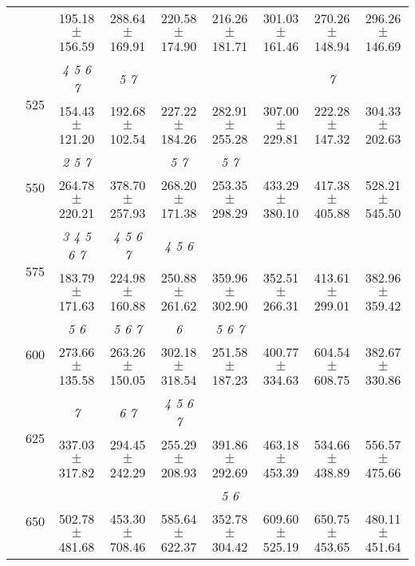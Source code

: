 \begin{table}[h]
{\begin{tabular}{
        ccccccccc}
 & & 195.18 $\pm$ 156.59& 288.64 $\pm$ 169.91& 220.58 $\pm$ 174.90& 216.26 $\pm$ 181.71& 301.03 $\pm$ 161.46& 270.26 $\pm$ 148.94& 296.26 $\pm$ 146.69 \\ 
 & \multirow{2}{*}{525}& \cellcolor[HTML]{EFEFEF} \textit{ 4 5 6 7 }& \cellcolor[HTML]{EFEFEF} \textit{ 5 7 }& \cellcolor[HTML]{EFEFEF} & \cellcolor[HTML]{EFEFEF} & \cellcolor[HTML]{EFEFEF} & \cellcolor[HTML]{EFEFEF} \textit{ 7 }& \cellcolor[HTML]{EFEFEF}  \\ 
 & & \cellcolor[HTML]{EFEFEF} 154.43 $\pm$ 121.20& \cellcolor[HTML]{EFEFEF} 192.68 $\pm$ 102.54& \cellcolor[HTML]{EFEFEF} 227.22 $\pm$ 184.26& \cellcolor[HTML]{EFEFEF} 282.91 $\pm$ 255.28& \cellcolor[HTML]{EFEFEF} 307.00 $\pm$ 229.81& \cellcolor[HTML]{EFEFEF} 222.28 $\pm$ 147.32& \cellcolor[HTML]{EFEFEF} 304.33 $\pm$ 202.63 \\ 
 & \multirow{2}{*}{550}& \textit{ 2 5 7 }& & \textit{ 5 7 }& \textit{ 5 7 }& & &  \\ 
 & & 264.78 $\pm$ 220.21& 378.70 $\pm$ 257.93& 268.20 $\pm$ 171.38& 253.35 $\pm$ 298.29& 433.29 $\pm$ 380.10& 417.38 $\pm$ 405.88& 528.21 $\pm$ 545.50 \\ 
 & \multirow{2}{*}{575}& \cellcolor[HTML]{EFEFEF} \textit{ 3 4 5 6 7 }& \cellcolor[HTML]{EFEFEF} \textit{ 4 5 6 7 }& \cellcolor[HTML]{EFEFEF} \textit{ 4 5 6 }& \cellcolor[HTML]{EFEFEF} & \cellcolor[HTML]{EFEFEF} & \cellcolor[HTML]{EFEFEF} & \cellcolor[HTML]{EFEFEF}  \\ 
 & & \cellcolor[HTML]{EFEFEF} 183.79 $\pm$ 171.63& \cellcolor[HTML]{EFEFEF} 224.98 $\pm$ 160.88& \cellcolor[HTML]{EFEFEF} 250.88 $\pm$ 261.62& \cellcolor[HTML]{EFEFEF} 359.96 $\pm$ 302.90& \cellcolor[HTML]{EFEFEF} 352.51 $\pm$ 266.31& \cellcolor[HTML]{EFEFEF} 413.61 $\pm$ 299.01& \cellcolor[HTML]{EFEFEF} 382.96 $\pm$ 359.42 \\ 
 & \multirow{2}{*}{600}& \textit{ 5 6 }& \textit{ 5 6 7 }& \textit{ 6 }& \textit{ 5 6 7 }& & &  \\ 
 & & 273.66 $\pm$ 135.58& 263.26 $\pm$ 150.05& 302.18 $\pm$ 318.54& 251.58 $\pm$ 187.23& 400.77 $\pm$ 334.63& 604.54 $\pm$ 608.75& 382.67 $\pm$ 330.86 \\ 
 & \multirow{2}{*}{625}& \cellcolor[HTML]{EFEFEF} \textit{ 7 }& \cellcolor[HTML]{EFEFEF} \textit{ 6 7 }& \cellcolor[HTML]{EFEFEF} \textit{ 4 5 6 7 }& \cellcolor[HTML]{EFEFEF} & \cellcolor[HTML]{EFEFEF} & \cellcolor[HTML]{EFEFEF} & \cellcolor[HTML]{EFEFEF}  \\ 
 & & \cellcolor[HTML]{EFEFEF} 337.03 $\pm$ 317.82& \cellcolor[HTML]{EFEFEF} 294.45 $\pm$ 242.29& \cellcolor[HTML]{EFEFEF} 255.29 $\pm$ 208.93& \cellcolor[HTML]{EFEFEF} 391.86 $\pm$ 292.69& \cellcolor[HTML]{EFEFEF} 463.18 $\pm$ 453.39& \cellcolor[HTML]{EFEFEF} 534.66 $\pm$ 438.89& \cellcolor[HTML]{EFEFEF} 556.57 $\pm$ 475.66 \\ 
 & \multirow{2}{*}{650}& & & & \textit{ 5 6 }& & &  \\ 
 & & 502.78 $\pm$ 481.68& 453.30 $\pm$ 708.46& 585.64 $\pm$ 622.37& 352.78 $\pm$ 304.42& 609.60 $\pm$ 525.19& 650.75 $\pm$ 453.65& 480.11 $\pm$ 451.64 \\ \midrule 


\end{tabular}}
\end{table}
